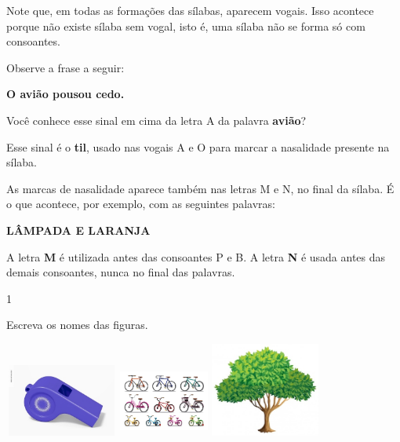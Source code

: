 {{Note que, em todas as formações das sílabas, aparecem vogais. Isso
acontece porque não existe sílaba sem vogal, isto é, uma  sílaba não
se forma só com consoantes.

Observe a frase a seguir:

\textbf{O avião pousou cedo.}

Você conhece esse sinal em cima da letra A da palavra \textbf{avião}?

Esse sinal é o \textbf{til}, usado nas vogais A e O para marcar a
nasalidade presente na sílaba.

As marcas de nasalidade aparece também nas letras M e N, no final da
sílaba. É o que acontece, por exemplo, com as seguintes palavras:

\textbf{LÂMPADA E LARANJA}

A letra \textbf{M} é utilizada antes das consoantes P e B.  
A letra \textbf{N} é usada antes das demais consoantes, nunca 
no final das palavras.


\num{1}

Escreva os nomes das figuras.


\includegraphics[width=1.46154in,height=0.93603in]{media/image49.jpeg}
\includegraphics[width=1.16587in,height=0.93269in]{media/image50.jpeg}
\includegraphics[width=1.42308in,height=1.21950in]{media/image51.jpeg}

}}
